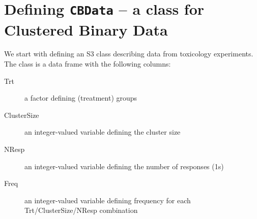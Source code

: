 \documentclass[reqno]{amsart}
\begin{document}
\section{Defining \texttt{CBData} -- a class for \textbf{C}lustered \textbf{B}inary \textbf{Data}}
We start with defining an S3 class describing data from toxicology experiments. The
class is a data frame with the following columns:

\begin{description}
\item[Trt] a factor defining (treatment) groups
\item[ClusterSize] an integer-valued variable defining the cluster size
\item[NResp] an integer-valued variable defining the number of responses (1s)
\item[Freq]  an integer-valued  variable defining frequency for each
Trt/ClusterSize/NResp combination
\end{description}
\end{document}
